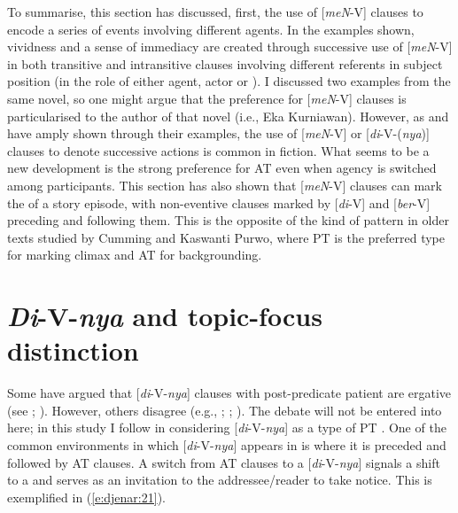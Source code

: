 \documentclass[output=paper
,modfonts
,nonflat]{langsci/langscibook}
\begin{document}
\noindent
To summarise, this section has discussed, first, the use of [\textit{meN}-V] clauses to encode a series of events involving different agents. In the examples shown, vividness and a sense of immediacy are created through successive use of [\textit{meN}-V] in both transitive and intransitive clauses involving different referents in subject position (in the role of either agent, actor or ). I discussed two examples from the same novel, so one might argue that the preference for [\textit{meN}-V] clauses is particularised to the author of that novel (i.e., Eka Kurniawan). However, as \citet{Cumming1991} and \citet{Kaswanti1988} have amply shown through their examples, the use of [\textit{meN}-V] or [\textit{di}-V-(\textit{nya})] clauses to denote successive actions is common in  fiction. What seems to be a new development is the strong preference for AT even when agency is switched among participants. This section has also shown that [\textit{meN}-V] clauses can mark the  of a story episode, with non-eventive clauses marked by [\textit{di}-V] and [\textit{ber}-V] preceding and following them. This is the opposite of the kind of pattern in older texts studied by Cumming and Kaswanti Purwo, where PT is the preferred  type for marking climax and AT for backgrounding.

\section{\label{s:djenar:5}\textit{Di}-V-\textit{nya} and topic-focus distinction}

Some have argued that [\textit{di}-V-\textit{nya}] clauses with post-predicate patient are ergative (see \citealt[232--233]{Hopper1979}; \citealt[14]{ArkaEtAl1998}). However, others disagree (e.g., \citealt{Cumming1987}; \citealt[33--34]{Cumming1991}; \citealt{Kroeger2014}). The debate will not be entered into here; in this study I follow \citet{Cumming1991} in considering [\textit{di}-V-\textit{nya}] as a type of PT . One of the common environments in which [\textit{di}-V-\textit{nya}] appears in  is where it is preceded and followed by AT clauses. A switch from AT clauses to a [\textit{di}-V-\textit{nya}]  signals a shift to a  and serves as an invitation to the addressee/reader to take notice. This is exemplified in (\ref{e:djenar:21}).
\end{document}
